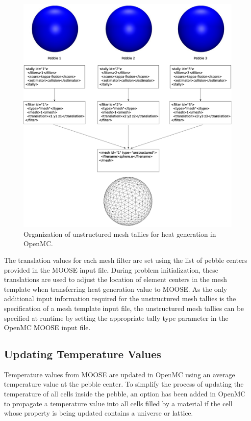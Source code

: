 \begin{figure}[ht]
    \centering
    \includegraphics[width=\textwidth]{Figures/umesh_tally_diagram}
    \caption{Organization of unstructured mesh tallies for heat generation in OpenMC.}
    \label{fig:umesh_tally_steup}
\end{figure}

The translation values for each mesh filter are set using the list of pebble centers provided in the MOOSE input file.
During problem initialization, these translations are used to adjust the location of element centers in the mesh template when transferring heat generation value to MOOSE.
As the only additional input information required for the unstructured mesh tallies is the specification of a mesh template input file, the unstructured mesh tallies can be specified at runtime by setting the appropriate tally type parameter in the OpenMC MOOSE input file.

\subsection{Updating Temperature Values}

Temperature values from MOOSE are updated in OpenMC using an average temperature value at the pebble center.
To simplify the process of updating the temperature of all cells inside the pebble, an option has been added in OpenMC to propagate a temperature value into all cells filled by a material if the cell whose property is being updated contains a universe or lattice.
